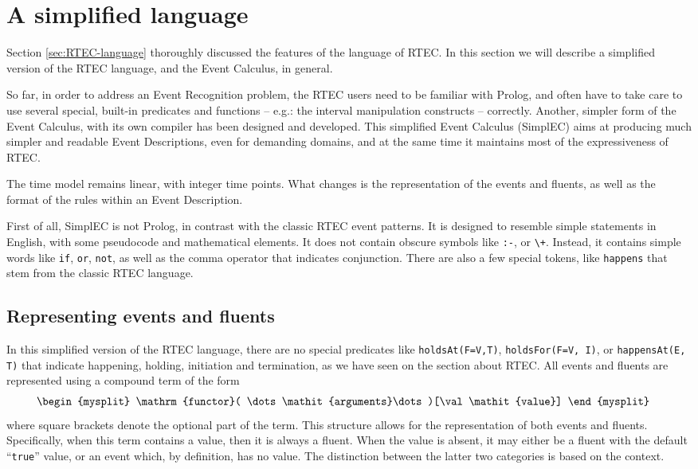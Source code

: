 \section{A simplified language}\label{sec:simple-language}

Section \ref{sec:RTEC-language} thoroughly discussed the features of the language of RTEC. In this section we will describe a simplified version of the RTEC language, and the Event Calculus, in general.

So far, in order to address an Event Recognition problem, the RTEC users need to be familiar with Prolog, and often have to take care to use several special, built-in predicates and functions -- e.g.: the interval manipulation constructs -- correctly. Another, simpler form of the Event Calculus, with its own compiler has been designed and developed. This simplified Event Calculus (SimplEC) aims at producing much simpler and readable Event Descriptions, even for demanding domains, and at the same time it maintains most of the expressiveness of RTEC.

The time model remains linear, with integer time points. What changes is the representation of the events and fluents, as well as the format of the rules within an Event Description.

First of all, SimplEC is not Prolog, in contrast with the classic RTEC event patterns. It is designed to resemble simple statements in English, with some pseudocode and mathematical elements. It does not contain obscure symbols like \texttt{:-}, or \texttt{\textbackslash +}. Instead, it contains simple words like \texttt{if}, \texttt{or}, \texttt{not}, as well as the comma operator that indicates conjunction. There are also a few special tokens, like \texttt{happens} that stem from the classic RTEC language.

\subsection{Representing events and fluents}

In this simplified version of the RTEC language, there are no special predicates like \texttt{holdsAt(F=V,T)}, \texttt{holdsFor(F=V, I)}, or \texttt{happensAt(E, T)} that indicate happening, holding, initiation and termination, as we have seen on the section about RTEC. All events and fluents are represented using a compound term of the form
%
\begin{align}
& \label{eq:compound_term}
\begin{mysplit}
\mathrm{functor}( \dots \mathit{arguments}\dots )[\val\mathit{value}]
\end{mysplit}
\end{align}
%
where square brackets denote the optional part of the term. This structure allows for the representation of both events and fluents. Specifically, when this term contains a value, then it is always a fluent. When the value is absent, it may either be a fluent with the default ``\texttt{true}'' value, or an event which, by definition, has no value. The distinction between the latter two categories is based on the context.

